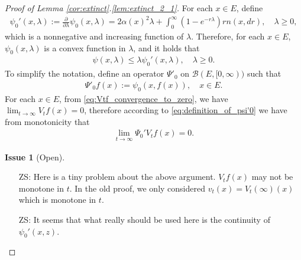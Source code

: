 \documentclass[12pt,a4paper]{amsart}
\numberwithin{equation}{section}
\theoremstyle{plain}
\theoremstyle{definition}
\newtheorem{iss}{Issue}
\begin{document}
\begin{proof}[Proof of Lemma \ref{cor:extinct}.\eqref{lem:extinct_2_1}]

For each $x\in E$, define 
\begin{align}
\label{eq:definition_of_psi'0}
 \psi_0'(x,\lambda):=\frac{\partial}{\partial \lambda}\psi_0(x,\lambda)
    =2\alpha(x)^2\lambda+\int_0^{\infty}\left(1-e^{-r\lambda}\right)rn(x,dr), 
    \quad \lambda \geq 0,
\end{align}
which is a nonnegative and increasing function of $\lambda$. 
Therefore, for each $x\in E$, $\psi_0(x,\lambda)$ is a convex function in $\lambda$, and it holds that
\begin{align}
\psi(x,\lambda) \leq \lambda \psi_0'(x,\lambda),
\quad \lambda \geq 0.
\label{eq:6}
\end{align}
To simplify the notation, define an operator $\Psi'_0$ on $\mathcal B(E,[0,\infty))$ such that
\begin{align}
\Psi'_0 f(x) := \psi_0(x,f(x)), \quad x\in E.
\end{align}
For each $x\in E$, from \eqref{eq:Vtf_convergence_to_zero}, we have $\lim_{t\to \infty} V_tf(x) = 0$, therefore according to \eqref{eq:definition_of_psi'0} we have from monotonicity that 
\begin{align}
\label{eq:psi0'vt_converges_to_0}
\lim_{t\to \infty}\Psi_0' V_tf(x) = 0.
\end{align}
\begin{iss}[Open]~
  \begin{itemize}
  \item[ZS:]
Here is a tiny problem about the above argument. $V_t f(x)$ may not be monotone in $t$. In the old proof, we only considered $v_t(x) = V_t(\infty)(x)$ which is monotone in $t$. 
  \item[ZS:]
It seems that what really should be used here is the continuity of $\psi_0'(x,z)$.
  \end{itemize}
\end{iss}


\end{proof}
\end{document}
